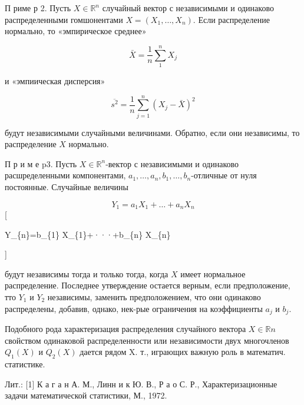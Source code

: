 \documentclass[10pt]{article}
\begin{document}
П риме р 2. Пусть $X \in \mathbb{R}^{n}$ случайный вектор с независимыми и одинаково распределенными гомшонентами $X=\left(X_{1}, \ldots, X_{n}\right)$. Если распределение нормально, то «эмпирическое среднее»



\[

\bar{X}=\frac{1}{n} \sum_{1}^{n} X_{j}

\]



и «эмпиическая дисперсия»



\[

\overline{s^{2}}=\frac{1}{n} \sum_{j=1}^{n}\left(X_{j}-\bar{X}\right)^{2}

\]



будут независимыми случайными величинами. Обратно, если они независимы, то распределение $X$ нормально.



П р и м е $\mathrm{p} 3$. Пусть $X \in \mathbb{R}^{n}$-вектор с независимыми и одинаково расшределенными компонентами, $a_{1}, \ldots, a_{n}, b_{1}, \ldots, b_{n}$-отличные от нуля постоянные. Случайные величины



\[

Y_{1}=a_{1} X_{1}+\ldots+a_{n} X_{n}

\][



Y\_\{n\}=b\_\{1\} X\_\{1\}+···+b\_\{n\} X\_\{n\}

]



будут независимы тогда и только тогда, когда $X$ имеет нормальное распределение. Последнее утверждение остается верным, если предположение, тто $Y_{1}$ и $Y_{2}$ независимы, заменить предположением, что они одинаково распределены, добавив, однако, нек-рые ограничения на коэффициенты $a_{j}$ и $b_{j}$.



Подобного рода характеризация распределения случайного вектора $X \in \mathbb{R} n$ свойством одинаковой распределенности или независимости двух многочленов $Q_{1}(X)$ и $Q_{2}(X)$ дается рядом X. т., играющих важную роль в математич. статистике.



Лит.: [1] К а г а н А. М., Линн и к Ю. В., Р а о С. Р., Характеризационные задачи математической статистики, М., 1972.
\end{document}

